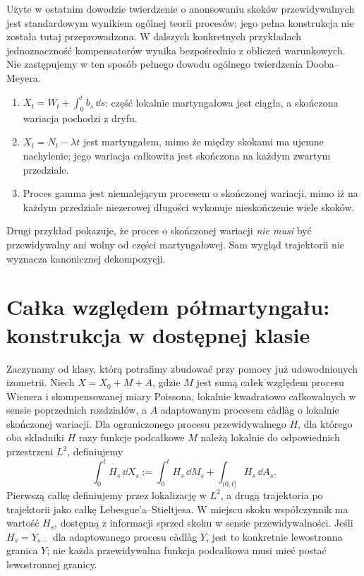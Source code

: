 \begin{uwaga}
Użyte w ostatnim dowodzie twierdzenie o anonsowaniu skoków
przewidywalnych jest standardowym wynikiem ogólnej teorii
procesów; jego pełna konstrukcja nie została tutaj
przeprowadzona. W dalszych konkretnych przykładach
jednoznaczność kompensatorów wynika bezpośrednio z
obliczeń warunkowych. Nie zastępujemy w ten sposób
pełnego dowodu ogólnego twierdzenia Dooba--Meyera.
\end{uwaga}

\begin{przyklad}
\begin{enumerate}
\item $X_t=W_t+\int_0^tb_s\,\dd s$: część
lokalnie martyngałowa jest ciągła, a skończona wariacja
pochodzi z dryfu.
\item $X_t=N_t-\lambda t$ jest martyngałem, mimo że
między skokami ma ujemne nachylenie; jego wariacja
całkowita jest skończona na każdym zwartym przedziale.
\item Proces gamma jest niemalejącym procesem o
skończonej wariacji, mimo iż na każdym przedziale
niezerowej długości wykonuje nieskończenie wiele skoków.
\end{enumerate}
Drugi przykład pokazuje, że proces o skończonej wariacji
\emph{nie musi} być przewidywalny ani wolny od części
martyngałowej. Sam wygląd trajektorii nie wyznacza
kanonicznej dekompozycji.
\end{przyklad}

\section{Całka względem półmartyngału: konstrukcja w dostępnej klasie}

Zaczynamy od klasy, którą potrafimy zbudować przy pomocy
już udowodnionych izometrii. Niech $X=X_0+M+A$, gdzie
$M$ jest sumą całek względem procesu Wienera i
skompensowanej miary Poissona, lokalnie kwadratowo
całkowalnych w sensie poprzednich rozdziałów, a $A$
adaptowanym procesem càdlàg o lokalnie skończonej wariacji.
Dla ograniczonego procesu przewidywalnego $H$, dla którego
oba składniki $H$ razy funkcje podcałkowe $M$ należą lokalnie
do odpowiednich przestrzeni $L^2$, definiujemy
\[
\int_0^t H_s\,\dd X_s
:=\int_0^tH_s\,\dd M_s+\int_{(0,t]}H_s\,\dd A_s.
\tag{12.1}\label{eq:semi-integral}
\]
Pierwszą całkę definiujemy przez lokalizację w $L^2$,
a drugą trajektoria po trajektorii jako całkę Lebesgue'a--Stieltjesa.
W miejscu skoku współczynnik ma wartość $H_s$, dostępną
z informacji sprzed skoku w sensie przewidywalności. Jeśli
$H_s=Y_{s-}$ dla adaptowanego procesu càdlàg $Y$, jest to
konkretnie lewostronna granica $Y$; nie każda przewidywalna
funkcja podcałkowa musi mieć postać lewostronnej granicy.

